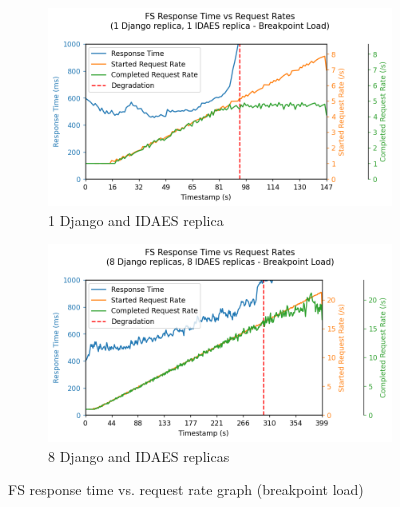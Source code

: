 \begin{figure}[h]
    \centering
    \begin{subfigure}{.5\textwidth}
      \centering
      \includegraphics[width=\linewidth]{figures/fs-replica-count-i1-response-graph-breakpoint.png}
      \caption{1 Django and IDAES replica}
    \end{subfigure}%
    \begin{subfigure}{.5\textwidth}
      \centering
      \includegraphics[width=\linewidth]{figures/fs-replica-count-i4-response-graph-breakpoint.png}
      \caption{8 Django and IDAES replicas}
    \end{subfigure}

    \caption{FS response time vs. request rate graph (breakpoint load)}
    \label{figure:fs-replica-count-graph-breakpoint}
\end{figure}

